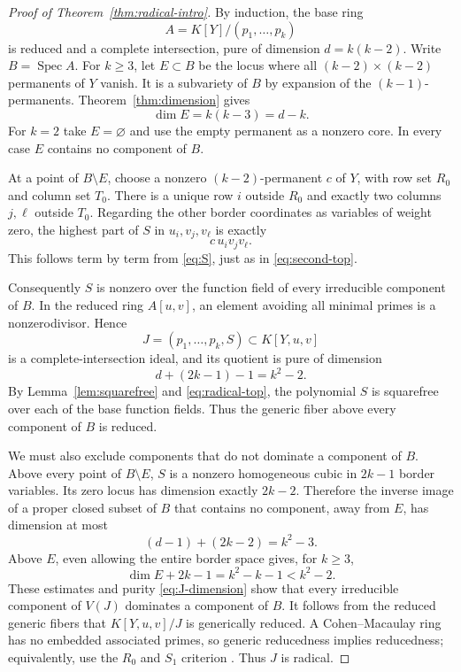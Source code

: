 \documentclass[11pt]{article}
\theoremstyle{remark}
\DeclareMathOperator{\Spec}{Spec}
\newcommand{\kk}{K}
\numberwithin{equation}{section}
\begin{document}
\begin{proof}[Proof of Theorem~\ref{thm:radical-intro}]
By induction, the base ring
\[
 A=\kk[Y]/(p_1,\ldots,p_k)
\]
is reduced and a complete intersection, pure of dimension
$d=k(k-2)$. Write $B=\Spec A$.
For $k\geq3$, let $E\subset B$ be the locus where all
$(k-2)\times(k-2)$ permanents of $Y$ vanish. It is a subvariety of
$B$ by expansion of the $(k-1)$-permanents. Theorem~\ref{thm:dimension}
gives
\begin{equation}\label{eq:E-dimension}
 \dim E=k(k-3)=d-k.
\end{equation}
For $k=2$ take $E=\varnothing$ and use the empty permanent as a
nonzero core. In every case $E$ contains no component of $B$.

At a point of $B\setminus E$, choose a nonzero $(k-2)$-permanent
$c$ of $Y$, with row set $R_0$ and column set $T_0$.
There is a unique row $i$ outside $R_0$ and exactly two columns
$j,\ell$ outside $T_0$. Regarding the other border coordinates
as variables of weight zero, the highest part of $S$ in
$u_i,v_j,v_\ell$ is exactly
\begin{equation}\label{eq:radical-top}
 c\,u_i v_jv_\ell.
\end{equation}
This follows term by term from \eqref{eq:S}, just as in
\eqref{eq:second-top}.

Consequently $S$ is nonzero over the function field of every
irreducible component of $B$. In the reduced ring $A[u,v]$, an
element avoiding all minimal primes is a nonzerodivisor. Hence
\[
 J=(p_1,\ldots,p_k,S)\subset\kk[Y,u,v]
\]
is a complete-intersection ideal, and its quotient is pure of
dimension
\begin{equation}\label{eq:J-dimension}
 d+(2k-1)-1=k^2-2.
\end{equation}
By Lemma~\ref{lem:squarefree} and \eqref{eq:radical-top}, the
polynomial $S$ is squarefree over each of the base function fields.
Thus the generic fiber above every component of $B$ is reduced.

We must also exclude components that do not dominate a component of
$B$. Above every point of $B\setminus E$, $S$ is a nonzero
homogeneous cubic in $2k-1$ border variables. Its zero locus has
dimension exactly $2k-2$. Therefore the inverse image of a proper
closed subset of $B$ that contains no component, away from $E$,
has dimension at most
\[
 (d-1)+(2k-2)=k^2-3.
\]
Above $E$, even allowing the entire border space gives, for $k\geq3$,
\begin{equation}\label{eq:no-vertical}
 \dim E+2k-1=k^2-k-1<k^2-2.
\end{equation}
These estimates and purity \eqref{eq:J-dimension} show that every
irreducible component of $V(J)$ dominates a component of $B$.
It follows from the reduced generic fibers that $\kk[Y,u,v]/J$
is generically reduced. A Cohen--Macaulay ring has no embedded
associated primes, so generic reducedness implies reducedness;
equivalently, use the $R_0$ and $S_1$ criterion
\cite[Tag 031R]{Stacks}. Thus $J$ is radical.


\end{proof}
\end{document}
